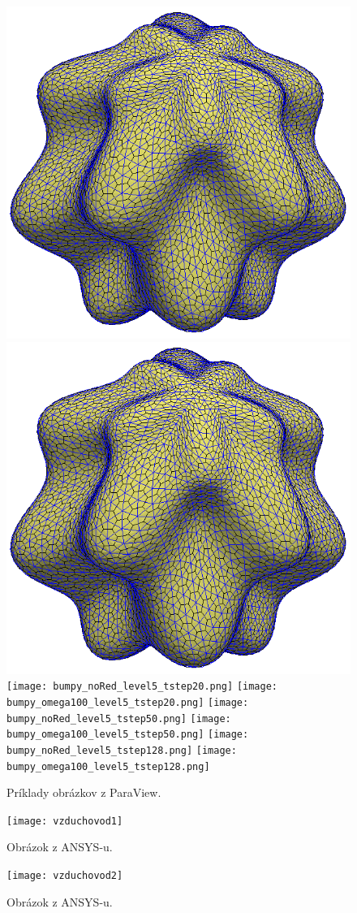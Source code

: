 \begin{figure}[p]
	\centering
	\includegraphics[width=0.35\linewidth]{bumpy_noRed_level5_tstep0_FT.png}
	\hspace{0.1\linewidth}
	\includegraphics[width=0.35\linewidth]{bumpy_noRed_level5_tstep0_FT.png}
	\newline
	\texttt{[image: bumpy\_noRed\_level5\_tstep20.png]}
	\hspace{0.1\linewidth}
	\texttt{[image: bumpy\_omega100\_level5\_tstep20.png]}
	\newline
	\texttt{[image: bumpy\_noRed\_level5\_tstep50.png]}
	\hspace{0.1\linewidth}
	\texttt{[image: bumpy\_omega100\_level5\_tstep50.png]}
	\newline
	\texttt{[image: bumpy\_noRed\_level5\_tstep128.png]}
	\hspace{0.1\linewidth}
	\texttt{[image: bumpy\_omega100\_level5\_tstep128.png]}
	\newline
	\caption{Príklady obrázkov z ParaView.}\label{fig:bumpy_sphere} 
\end{figure}

\begin{figure}[!h]
	\centering
	\vspace{-5pt}
	\begin{minipage}{.5\linewidth}
		\centering
		\texttt{[image: vzduchovod1]}
		\vspace{-5pt}
		\caption{Obrázok z ANSYS-u.}
		\label{fig:vzduchovod_geom}
	\end{minipage}%
	\begin{minipage}{.5\linewidth}
		\centering
		\texttt{[image: vzduchovod2]}
		\vspace{-5pt}
		\caption{Obrázok z ANSYS-u.}
		\label{fig:vzduchovod_mesh}
	\end{minipage}
	\vspace{-5pt}
\end{figure}

